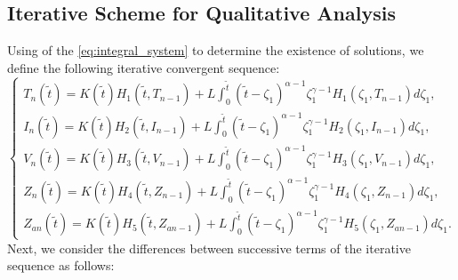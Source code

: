 \documentclass{article}
\theoremstyle{plain}
\theoremstyle{definition}
\numberwithin{equation}{section}
\begin{document}



\subsection{Iterative Scheme for Qualitative Analysis}
Using of the \eqref{eq:integral_system} to determine the existence of solutions, we define the following iterative convergent sequence:
\begin{equation}
	\begin{cases}
		T_n(\tilde{t}) = K(\tilde{t}) H_1(\tilde{t}, T_{n-1}) + L \int_0^{\tilde{t}} (\tilde{t}-\zeta_1)^{\alpha-1} \zeta_1^{\gamma-1} H_1(\zeta_1, T_{n-1}) d\zeta_1, \\[10pt]
		I_n(\tilde{t}) = K(\tilde{t}) H_2(\tilde{t}, I_{n-1}) + L \int_0^{\tilde{t}} (\tilde{t}-\zeta_1)^{\alpha-1} \zeta_1^{\gamma-1} H_2(\zeta_1, I_{n-1}) d\zeta_1, \\[10pt]
		V_n(\tilde{t}) = K(\tilde{t}) H_3(\tilde{t}, V_{n-1}) + L \int_0^{\tilde{t}} (\tilde{t}-\zeta_1)^{\alpha-1} \zeta_1^{\gamma-1} H_3(\zeta_1, V_{n-1}) d\zeta_1, \\[10pt]
		Z_n(\tilde{t}) = K(\tilde{t}) H_4(\tilde{t}, Z_{n-1}) + L \int_0^{\tilde{t}} (\tilde{t}-\zeta_1)^{\alpha-1} \zeta_1^{\gamma-1} H_4(\zeta_1, Z_{n-1}) d\zeta_1, \\[10pt]
		Z_{an}(\tilde{t}) = K(\tilde{t}) H_5(\tilde{t}, Z_{an-1}) + L \int_0^{\tilde{t}} (\tilde{t}-\zeta_1)^{\alpha-1} \zeta_1^{\gamma-1} H_5(\zeta_1, Z_{an-1}) d\zeta_1.
	\end{cases}
\end{equation}
Next, we consider the differences between successive terms of the iterative sequence as follows:
\end{document}
